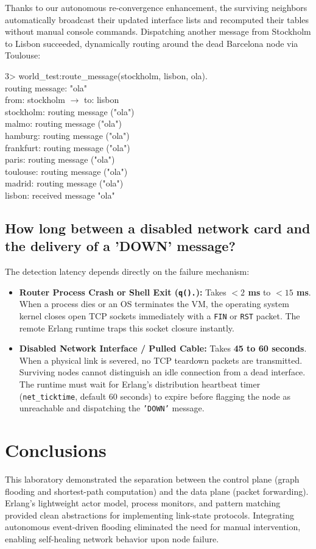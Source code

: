 \documentclass[a4paper, 11pt]{article}
\begin{document}
Thanks to our autonomous re-convergence enhancement, the surviving neighbors automatically broadcast their updated interface lists and recomputed their tables without manual console commands. Dispatching another message from Stockholm to Lisbon succeeded, dynamically routing around the dead Barcelona node via Toulouse:
\begin{tcolorbox}[terminalbox]
3> world\_test:route\_message(stockholm, lisbon, ola). \\
routing message: "ola" \\
from: stockholm $\rightarrow$ to: lisbon \\
stockholm: routing message ("ola") \\
malmo: routing message ("ola") \\
hamburg: routing message ("ola") \\
frankfurt: routing message ("ola") \\
paris: routing message ("ola") \\
toulouse: routing message ("ola") \\
madrid: routing message ("ola") \\
lisbon: received message "ola"
\end{tcolorbox}

\subsection{How long between a disabled network card and the delivery of a 'DOWN' message?}
The detection latency depends directly on the failure mechanism:
\begin{itemize}
    \item \textbf{Router Process Crash or Shell Exit (\texttt{q().}):} Takes \textbf{$< 2$ ms} to \textbf{$< 15$ ms}. When a process dies or an OS terminates the VM, the operating system kernel closes open TCP sockets immediately with a \texttt{FIN} or \texttt{RST} packet. The remote Erlang runtime traps this socket closure instantly.
    \item \textbf{Disabled Network Interface / Pulled Cable:} Takes \textbf{45 to 60 seconds}. When a physical link is severed, no TCP teardown packets are transmitted. Surviving nodes cannot distinguish an idle connection from a dead interface. The runtime must wait for Erlang's distribution heartbeat timer (\texttt{net\_ticktime}, default 60 seconds) to expire before flagging the node as unreachable and dispatching the \texttt{'DOWN'} message.
\end{itemize}

\section{Conclusions}

This laboratory demonstrated the separation between the control plane (graph flooding and shortest-path computation) and the data plane (packet forwarding). Erlang's lightweight actor model, process monitors, and pattern matching provided clean abstractions for implementing link-state protocols. Integrating autonomous event-driven flooding eliminated the need for manual intervention, enabling self-healing network behavior upon node failure.
\end{document}
